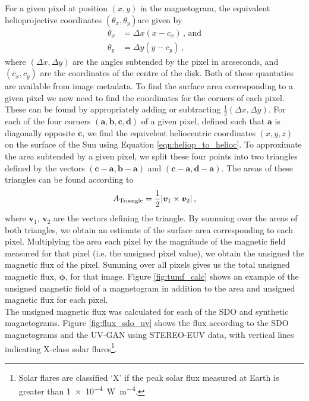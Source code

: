 \documentclass[11pt,a4paper,onecolumn]{report}
\DeclarePairedDelimiter{\abs}{\lvert}{\rvert}
\begin{document}
For a given pixel at position \( (x, y) \) in the magnetogram, the equivalent
helioprojective coordinates \((\theta_x, \theta_y)\)are given by
\begin{align}
  \theta_x &= \Delta x (x - c_x) \, \text{, and} \\
  \theta_y &= \Delta y (y - c_y) \, ,
\end{align}
where  \((\Delta x, \Delta y)\) are the angles subtended by the pixel in
arcseconds, and \( (c_x, c_y) \) are the coordinates of the centre of the disk.
Both of these quantaties are available from image metadata. To find the surface
area corresponding to a given pixel we now need to find the coordinates for the
corners of each pixel. These can be found by appropriately adding or subtracting
\(\frac{1}{2} (\Delta x, \Delta y)\). For each of the four corners \((\bm{a},
\bm{b}, \bm{c}, \bm{d})\) of a given pixel, defined such that $\bm{a}$ is
diagonally opposite $\bm{c}$, we find the equivelent heliocentric coordinates
\((x, y, z)\) on the surface of the Sun using Equation
\ref{eqn:heliop_to_helioc}. To approximate the area subtended by a given pixel,
we split these four points into two triangles defined by the vectors
\((\bm{c}-\bm{a}, \bm{b} - \bm{a}) \) and \((\bm{c}-\bm{a}, \bm{d} - \bm{a}) \).
The areas of these triangles can be found according to
\begin{align}
  A_{\text{Triangle}} = \frac{1}{2} \abs*{\bm{v}_1 \times \bm{v}_2} \, ,
\end{align}
where \(\bm{v}_1\), \(\bm{v}_2\) are the vectors defining the triangle. By
summing over the areas of both triangles, we obtain an estimate of the surface
area corresponding to each pixel. Multiplying the area each pixel by the
magnitude of the magnetic field measured for that pixel (i.e. the unsigned pixel
value), we obtain the unsigned the magnetic flux of the pixel. Summing over all
pixels gives us the total unsigned magnetic flux, \(\bm{\phi}\), for that image.
Figure \ref{fig:tumf_calc} shows an example of the unsigned magnetic field of a
magnetogram in addition to the area and unsigned magnetic flux for each pixel.
\\

The unsigned magnetic flux was calculated for each of the SDO and synthetic
magnetograms. Figure \ref{fig:flux_sdo_uv} shows the flux according to the SDO
magnetograms and the UV-GAN using STEREO-EUV data, with vertical lines
indicating X-class solar flares\footnote{Solar flares are classified `X' if the
peak solar flux measured at Earth is greater than \SI{1e-4}{W.m^{-4}}.}.
\end{document}
